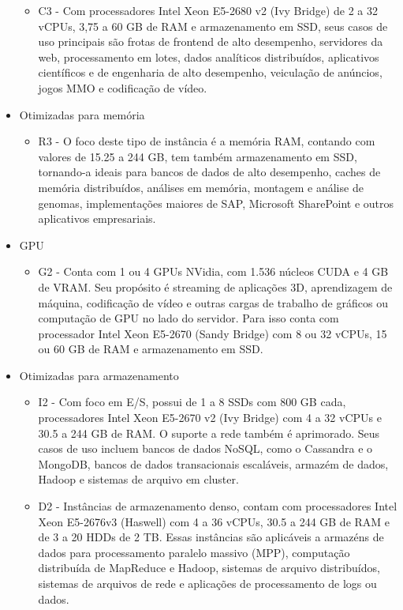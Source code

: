 \documentclass[tg]{mdtufsm}
\begin{document}
\begin{itemize}
\begin{itemize}
	\item C3 - Com processadores Intel Xeon E5-2680 v2 (Ivy Bridge) de 2 a 32 vCPUs, 3,75 a 60 GB de RAM e armazenamento em SSD, seus casos de uso principais são frotas de frontend de alto desempenho, servidores da web, processamento em lotes, dados analíticos distribuídos, aplicativos científicos e de engenharia de alto desempenho, veiculação de anúncios, jogos MMO e codificação de vídeo.
	\end{itemize}
\item Otimizadas para memória
	\begin{itemize}
	\item R3 - O foco deste tipo de instância é a memória RAM, contando com valores de 15.25 a 244 GB, tem também armazenamento em SSD, tornando-a ideais para bancos de dados de alto desempenho, caches de memória distribuídos, análises em memória, montagem e análise de genomas, implementações maiores de SAP, Microsoft SharePoint e outros aplicativos empresariais.
	\end{itemize}
\item GPU
	\begin{itemize}
	\item G2 - Conta com 1 ou 4 GPUs NVidia, com 1.536 núcleos CUDA e 4 GB de VRAM. Seu propósito é streaming de aplicações 3D, aprendizagem de máquina, codificação de vídeo e outras cargas de trabalho de gráficos ou computação de GPU no lado do servidor. Para isso conta com processador Intel Xeon E5-2670 (Sandy Bridge) com 8 ou 32 vCPUs, 15 ou 60 GB de RAM e armazenamento em SSD.
	\end{itemize}
\item Otimizadas para armazenamento
	\begin{itemize}
	\item I2 - Com foco em E/S, possui de 1 a 8 SSDs com 800 GB cada, processadores Intel Xeon E5-2670 v2 (Ivy Bridge) com 4 a 32 vCPUs e 30.5 a 244 GB de RAM. O suporte a rede também é aprimorado. Seus casos de uso incluem bancos de dados NoSQL, como o Cassandra e o MongoDB, bancos de dados transacionais escaláveis, armazém de dados, Hadoop e sistemas de arquivo em cluster.
	\item D2 - Instâncias de armazenamento denso, contam com processadores Intel Xeon E5-2676v3 (Haswell) com 4 a 36 vCPUs, 30.5 a 244 GB de RAM e de 3 a 20 HDDs de 2 TB. Essas instâncias são aplicáveis a armazéns de dados para processamento paralelo massivo (MPP), computação distribuída de MapReduce e Hadoop, sistemas de arquivo distribuídos, sistemas de arquivos de rede e aplicações de processamento de logs ou dados.
	\end{itemize}
\end{itemize}
\end{document}

